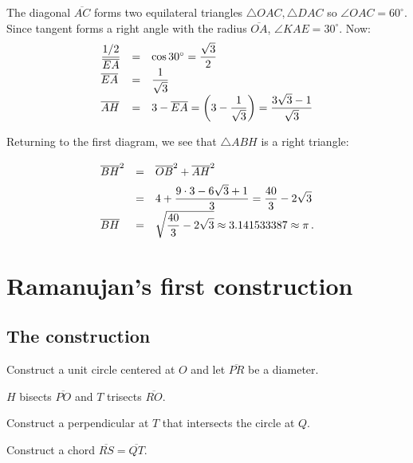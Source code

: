 The diagonal $\overline{AC}$ forms two equilateral triangles $\triangle OAC, \triangle DAC$ so $\angle OAC=60^\circ$. Since tangent forms a right angle with the radius $\overline{OA}$, $\angle KAE=30^\circ$. Now:
\begin{displaymath}
\renewcommand{\arraystretch}{1.5}
\begin{array}{lcl}
\disfrac{1/2}{\overline{EA}}&=&
\cos 30^\circ=\disfrac{\sqrt{3}}{2}\\
\overline{EA}&=&\disfrac{1}{\sqrt{3}}\\
\overline{AH}&=&3-\overline{EA}=\left(3-\disfrac{1}{\sqrt{3}}\right)
=\disfrac{3\sqrt{3}-1}{\sqrt{3}}\\
\end{array}
\end{displaymath}

Returning to the first diagram, we see that $\triangle ABH$ is a right triangle:
\begin{displaymath}
\renewcommand{\arraystretch}{2}
\begin{array}{lcl}
\overline{BH}^2&=&\overline{OB}^2+\overline{AH}^2\\
&=&4+\disfrac{9\cdot 3 -6\sqrt{3}+1}{3}=\disfrac{40}{3}-2\sqrt{3}\\
\overline{BH}&=&\sqrt{\disfrac{40}{3}-2\sqrt{3}}\approx 3.141533387\approx \pi\,.
\end{array}
\end{displaymath}

\newpage





\section{Ramanujan's first construction}


\subsection{The construction}

Construct a unit circle centered at $O$ and let $\overline{PR}$ be a diameter. 

$H$ bisects $\overline{PO}$ and $T$ trisects $\overline{RO}$. 

Construct a perpendicular at $T$ that intersects the circle at $Q$.

Construct a chord $\overline{RS}=\overline{QT}$.

